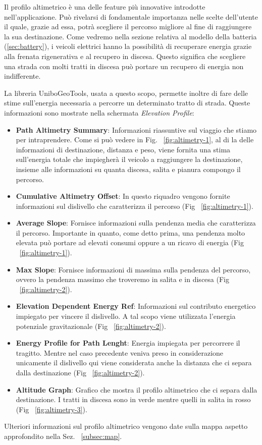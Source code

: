 Il profilo altimetrico è una delle feature più innovative introdotte nell'applicazione. Può rivelarsi di fondamentale importanza nelle scelte dell'utente il quale, grazie ad essa, potrà scegliere il percorso migliore al fine di raggiungere la sua destinazione. Come vedremo nella sezione relativa al modello della batteria (\ref{sec:battery}), i veicoli elettrici hanno la possibilità di recuperare energia grazie alla frenata rigenerativa e al recupero in discesa. Questo significa che scegliere una strada con molti tratti in discesa può portare un recupero di energia non indifferente. 

La libreria UniboGeoTools, usata a questo scopo, permette inoltre di fare delle stime sull'energia necessaria a percorre un determinato tratto di strada. Queste informazioni sono mostrate nella schermata \emph{Elevation Profile}:

\begin{itemize}
	\item \textbf{Path Altimetry Summary}: Informazioni riassuntive sul viaggio che stiamo per intraprendere. Come si può vedere in Fig. ~\ref{fig:altimetry-1}, al di la delle informazioni di destinazione, distanza e peso, viene fornita una stima sull'energia totale che impiegherà il veicolo a raggiungere la destinazione, insieme alle informazioni su quanta discesa, salita e pianura compongo il percorso.
	\item \textbf{Cumulative Altimetry Offset}: In questo riquadro vengono fornite informazioni sul dislivello che caratterizza il percorso (Fig ~\ref{fig:altimetry-1}).
	\item \textbf{Average Slope}: Fornisce informazioni sulla pendenza media che caratterizza il percorso. Importante in quanto, come detto prima, una pendenza molto elevata può portare ad elevati consumi oppure a un ricavo di energia (Fig ~\ref{fig:altimetry-1}).
	\item \textbf{Max Slope}: Fornisce informazioni di massima sulla pendenza del percorso, ovvero la pendenza massimo che troveremo in salita e in discesa (Fig ~\ref{fig:altimetry-2}).
	\item \textbf{Elevation Dependent Energy Ref}: Informazioni sul contributo energetico impiegato per vincere il dislivello. A tal scopo viene utilizzata l'energia potenziale gravitazionale (Fig ~\ref{fig:altimetry-2}).
	\item \textbf{Energy Profile for Path Lenght}: Energia impiegata per percorrere il tragitto. Mentre nel caso precedente veniva preso in considerazione unicamente il dislivello qui viene considerata anche la distanza che ci separa dalla destinazione (Fig ~\ref{fig:altimetry-2}).
	\item \textbf{Altitude Graph}: Grafico che mostra il profilo altimetrico che ci separa dalla destinazione. I tratti in discesa sono in verde mentre quelli in salita in rosso (Fig ~\ref{fig:altimetry-3}).
\end{itemize} 
\noindent
Ulteriori informazioni sul profilo altimetrico vengono date sulla mappa aspetto approfondito nella Sez. ~\ref{subsec:map}.


